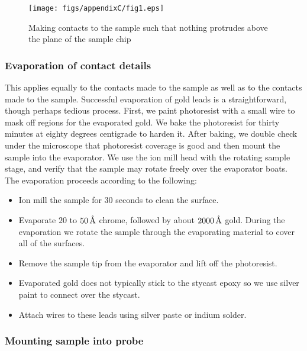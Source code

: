 \begin{figure}[p]
\texttt{[image: figs/appendixC/fig1.eps]}
\caption[Detail of sample contacts]
{Making contacts to the sample such that nothing protrudes 
above the plane of the sample chip}
\label{samplecontacts:fig}
\end{figure}

\subsubsection{Evaporation of contact details}

This applies equally to the contacts made to the sample as well
as to the contacts made to the sample. 
Successful evaporation of gold leads is a straightforward, though
perhaps tedious process. First, we paint photoresist with a small wire
to mask off regions for the evaporated gold. We bake the photoresist
for thirty minutes at eighty degrees centigrade to harden it. After
baking, we double
check under the microscope that photoresist coverage is good and then
mount the sample into the evaporator. We use the ion mill head with the
rotating sample stage, and verify that the sample may rotate freely 
over the evaporator boats. 
The evaporation proceeds according to the following:

\begin{itemize}

\item Ion mill the sample for 30 seconds to clean the surface. 

\item Evaporate $20$ to $50\,\mbox{\AA}$ chrome, followed by about 
$2000\,\mbox{\AA}$ gold. During the evaporation we 
rotate the sample through the
evaporating material to cover all of the surfaces. 

\item Remove the sample tip from the evaporator and lift off the photoresist. 

\item Evaporated gold does not typically stick to the stycast epoxy so we
use silver paint to connect over the stycast.

\item Attach wires to these leads using silver paste or indium 
solder. 

\end{itemize}

\subsubsection{Mounting sample into probe}

